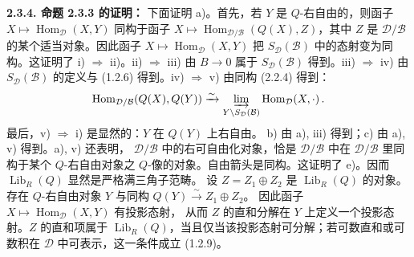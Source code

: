 \medskip\noindent\textbf{2.3.4. 命题 2.3.3 的证明：}\quad
{}
下面证明 a)。首先，若 $Y$ 是 $Q$-右自由的，则函子
$X\longmapsto\operatorname{Hom}_{\mathcal D}(X,Y)$ 同构于函子
$X\longmapsto\operatorname{Hom}_{\mathcal D/\mathcal B}(Q(X),Z)$，其中
$Z$ 是 $\mathcal D/\mathcal B$ 的某个适当对象。因此函子
$X\longmapsto\operatorname{Hom}_{\mathcal D}(X,Y)$ 把
$S_{\mathcal D}(\mathcal B)$ 中的态射变为同构。这证明了 i)
$\Rightarrow$ ii)。ii) $\Rightarrow$ iii) 由
$B\longrightarrow0$ 属于 $S_{\mathcal D}(\mathcal B)$ 得到。iii)
$\Rightarrow$ iv) 由 $S_{\mathcal D}(\mathcal B)$ 的定义与 (1.2.6)
得到。iv) $\Rightarrow$ v) 由同构 (2.2.4) 得到：
\[
  \operatorname{Hom}_{\mathcal D/\mathcal B}(Q(X),Q(Y))
  \xrightarrow{\sim}
  \varinjlim_{Y\backslash S_{\mathcal D}(\mathcal B)}
  \operatorname{Hom}_{\mathcal D}(X,\mathord\cdot)\, .
\]
最后，v) $\Rightarrow$ i) 是显然的：$Y$ 在 $Q(Y)$ 上右自由。
b) 由 a), iii) 得到；c) 由 a), v) 得到。a), v) 还表明，
$\mathcal D/\mathcal B$ 中的右可自由化对象，恰是 $\mathcal D/\mathcal B$ 中在
$\mathcal D/\mathcal B$ 里同构于某个
$Q$-右自由对象之 $Q$-像的对象。自由箭头是同构。这证明了 e)。因而
$\operatorname{Lib}_R(Q)$ 显然是严格满三角子范畴。
设 $Z=Z_1\oplus Z_2$ 是 $\operatorname{Lib}_R(Q)$ 的对象。存在
$Q$-右自由对象 $Y$ 与同构 $Q(Y)\xrightarrow{\sim}Z_1\oplus Z_2$。
因此函子 $X\longmapsto\operatorname{Hom}_{\mathcal D}(X,Y)$ 有投影态射，
从而 $Z$ 的直和分解在 $Y$ 上定义一个投影态射。$Z$ 的直和项属于
$\operatorname{Lib}_R(Q)$，当且仅当该投影态射可分解；若可数直和或可数积在
$\mathcal D$ 中可表示，这一条件成立 (1.2.9)。
\endgroup
